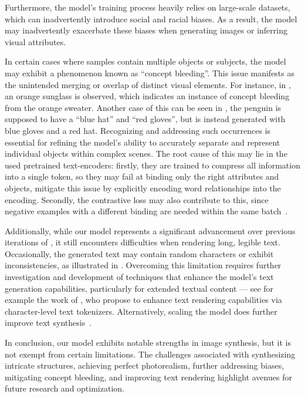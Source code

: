 \documentclass{article}
\begin{document}
Furthermore, the model's training process heavily relies on large-scale datasets,
%
which can inadvertently introduce social and racial biases. As a result, the model may inadvertently exacerbate these biases when generating images or inferring visual attributes. %

In certain cases where samples contain multiple objects or subjects, the model may exhibit a phenomenon known as ``concept bleeding''.
This issue manifests as the unintended merging or overlap of distinct visual elements.
For instance, in , an orange sunglass is observed, which indicates an instance of concept bleeding from the orange sweater.
Another case of this can be seen in , the penguin is supposed to have a ``blue hat'' and ``red gloves'', but is instead generated with blue gloves and a red hat.
Recognizing and addressing such occurrences is essential for refining the model's ability to accurately separate and represent individual objects within complex scenes.
The root cause of this may lie in the used pretrained text-encoders: firstly, they are trained to compress all information into a single token, so they may fail at binding only the right attributes and objects, \citet{feng2023trainingfree} mitigate this issue by explicitly encoding word relationships into the encoding. Secondly, the contrastive loss may also contribute to this, since negative examples with a different binding are needed within the same batch~\cite{rameshdalle2}.

Additionally, while our model represents a significant advancement over previous iterations of \sdshort, it still encounters difficulties when rendering long, legible text. Occasionally, the generated text may contain random characters or exhibit inconsistencies, as illustrated in .
Overcoming this limitation requires further investigation and development of techniques that enhance the model's text generation capabilities, particularly for extended textual content --- see for example the work of \citet{liu2023characteraware}, who propose to enhance text rendering capabilities via character-level text tokenizers. Alternatively, scaling the model does further improve text synthesis~\cite{yu2022scaling,saharia2022photorealistic}.

In conclusion, our model exhibits notable strengths in image synthesis, but it is not exempt from certain limitations. The challenges associated with synthesizing intricate structures, achieving perfect photorealism, further addressing biases, mitigating concept bleeding, and improving text rendering highlight avenues for future research and optimization.
\end{document}
